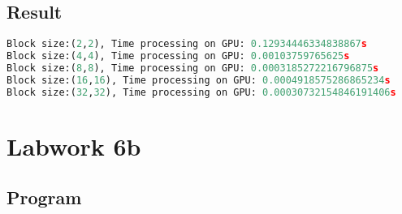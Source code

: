 \documentclass[12pt]{article}
\begin{document}
\subsection{Result}
 \begin{lstlisting}[language=Python]
Block size:(2,2), Time processing on GPU: 0.12934446334838867s
Block size:(4,4), Time processing on GPU: 0.00103759765625s
Block size:(8,8), Time processing on GPU: 0.0003185272216796875s
Block size:(16,16), Time processing on GPU: 0.0004918575286865234s
Block size:(32,32), Time processing on GPU: 0.00030732154846191406s
\end{lstlisting}

\section{Labwork 6b}
\subsection{Program}
\end{document}
